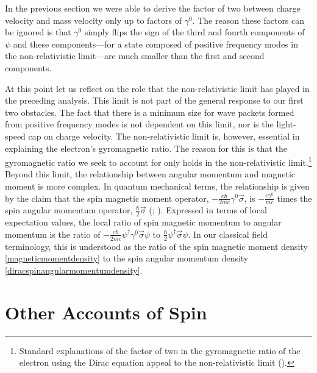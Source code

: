 \documentclass[onecolumn,secnumarabic,amsmath,amssymb,balancelastpage,nofootinbib]{article}
\begin{document}
In the previous section we were able to derive the factor of two between charge velocity and mass velocity only up to factors of $\gamma^0$.  The reason these factors can be ignored is that $\gamma^0$ simply flips the sign of the third and fourth components of $\psi$ and these components---for a state composed of positive frequency modes in the non-relativistic limit---are much smaller than the first and second components.

At this point let us reflect on the role that the non-relativistic limit has played in the preceding analysis.  This limit is not part of the general response to our first two obstacles.  The fact that there is a minimum size for wave packets formed from positive frequency modes is not dependent on this limit, nor is the light-speed cap on charge velocity.  The non-relativistic limit is, however, essential in explaining the electron's gyromagnetic ratio.  The reason for this is that the gyromagnetic ratio we seek to account for only holds in the non-relativistic limit.\footnote{Standard explanations of the factor of two in the gyromagnetic ratio of the electron using the Dirac equation appeal to the non-relativistic limit (\citealp[section 1.4]{bjorkendrell}).}  Beyond this limit, the relationship between angular momentum and magnetic moment is more complex.  In quantum mechanical terms, the relationship is given by the claim that the spin magnetic moment operator, $- \frac{e\hbar}{2 m c} \gamma^0 \vec{\sigma}$, is $-\frac{e\gamma^0}{m c}$ times the spin angular momentum operator, $\frac{\hbar}{2}\vec{\sigma}$ (\citealp[pg.\ 504]{ohanian}; \citealp[pg.\ 323]{frenkel}).  Expressed in terms of local expectation values, the local ratio of spin magnetic momentum to angular momentum is the ratio of $- \frac{e\hbar}{2 m c} \psi^\dagger \gamma^0 \vec{\sigma}\psi$ to $\frac{\hbar}{2}\psi^\dagger \vec{\sigma} \psi$.  In our classical field terminology, this is understood as the ratio of the spin magnetic moment density \eqref{magneticmomentdensity} to the spin angular momentum density \eqref{diracspinangularmomentumdensity}.







\section{Other Accounts of Spin}
\end{document}
